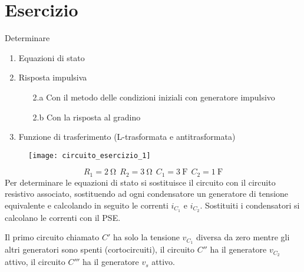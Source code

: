 
\section{Esercizio}
Determinare 
\begin{enumerate}
\item Equazioni di stato
\item Risposta impulsiva
\begin{enumerate}
\item[2.a] Con il metodo delle condizioni iniziali con generatore impulsivo
\item[2.b] Con la risposta al gradino
\end{enumerate}
\item Funzione di trasferimento (L-trasformata e antitrasformata)
\end{enumerate}
\begin{figure}[H]
\centering
\texttt{[image: circuito\_esercizio\_1]}
\end{figure}
$$
R_1 = \SI{2}{\ohm}\ \ R_2 = \SI{3}{\ohm}\ \ C_1 = \SI{3}{\farad}\ \ C_2 = \SI{1}{\farad}
$$
Per determinare le equazioni di stato si sostituisce il circuito con il circuito
resistivo associato, sostituendo ad ogni condensatore un generatore di tensione
equivalente e calcolando in seguito le correnti $i_{C_1}$ e $i_{C_2}$.
Sostituiti i condensatori si calcolano le correnti con il PSE.

Il primo circuito chiamato $C'$ ha solo la tensione $v_{C_1}$ diversa da zero
mentre gli altri generatori sono spenti (cortocircuiti), il circuito $C''$ ha il generatore $v_{C_2}$ attivo, il circuito $C'''$ ha il generatore $v_s$ attivo.

